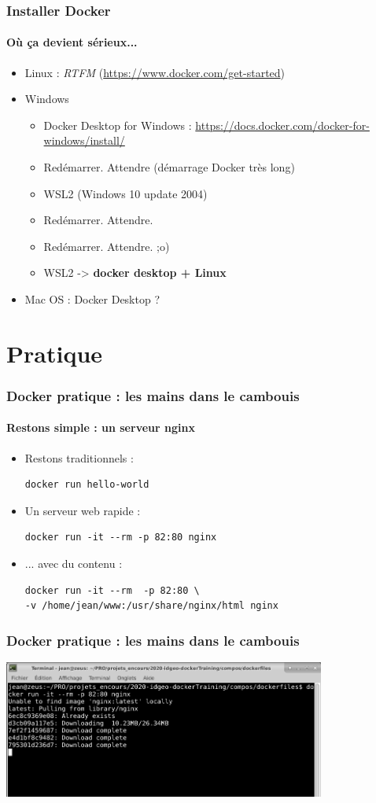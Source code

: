 \documentclass[11pt]{beamer}
\begin{document}
\begin{frame}
\frametitle{Installer Docker}
\framesubtitle{Où ça devient sérieux...}
\begin{itemize}
	\item Linux : \textit{RTFM} (\url{https://www.docker.com/get-started})
	\item Windows
	\begin{itemize}
		\item Docker Desktop for Windows : 
		\url{https://docs.docker.com/docker-for-windows/install/}
		\item Redémarrer. Attendre (démarrage Docker très long)
		\item WSL2 (Windows 10 update 2004)
		\item Redémarrer. Attendre.
		\item Redémarrer. Attendre.   ;o)
		\item WSL2  -> \textbf{docker desktop + Linux}
	\end{itemize}
	\item Mac OS : Docker Desktop ?
\end{itemize}
\end{frame}

\section{Pratique}

\begin{frame}[fragile]
\frametitle{Docker pratique : les mains dans le cambouis }
\framesubtitle{Restons simple : un serveur nginx}
\begin{itemize}
	\item Restons traditionnels : 
	\begin{lstlisting}
docker run hello-world	
	\end{lstlisting}
	\item Un serveur web rapide : 
	\begin{lstlisting}
docker run -it --rm -p 82:80 nginx
	\end{lstlisting}
	\item ... avec du contenu : 
	\begin{lstlisting}
docker run -it --rm  -p 82:80 \
-v /home/jean/www:/usr/share/nginx/html nginx
	\end{lstlisting}
\end{itemize}
\end{frame}

\begin{frame}[fragile]
\frametitle{Docker pratique : les mains dans le cambouis }
\includegraphics[width=400px]{imgs/docker-run.png}
\end{frame}
\end{document}
